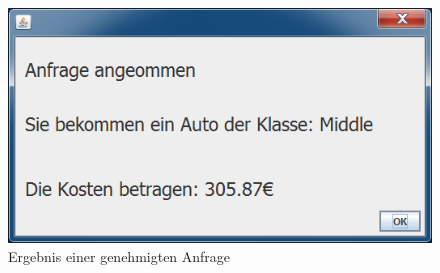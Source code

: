 \begin{figure}
	\centering
	\includegraphics[width=0.7\linewidth]{Bilder/Screenshots/ergebnis}
	\caption{Ergebnis einer genehmigten Anfrage}
	\label{fig:ergebnis}
\end{figure}



%


